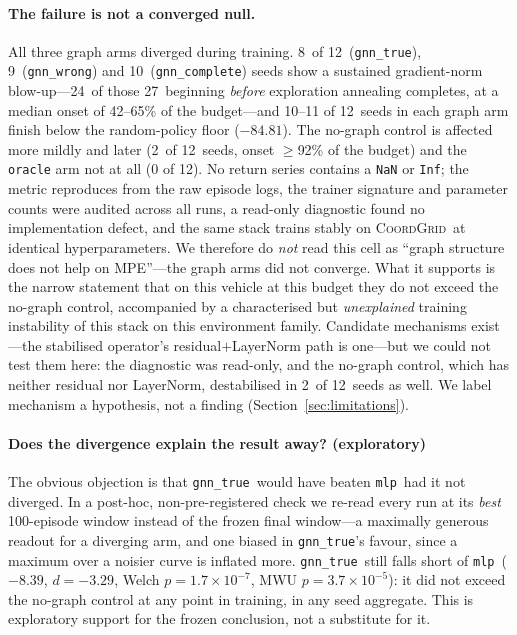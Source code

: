 \documentclass[10pt]{article}
\newcommand{\coordgrid}{\textsc{CoordGrid}}
\newcommand{\gtrue}{\texttt{gnn\_true}}
\newcommand{\gwrong}{\texttt{gnn\_wrong}}
\newcommand{\gcomplete}{\texttt{gnn\_complete}}
\newcommand{\mlpc}{\texttt{mlp}}
\newcommand{\PDseeds}{12}
\newcommand{\PDfloor}{-84.81}          %
\newcommand{\PDpeakGap}{-8.39}         %
\newcommand{\PDpeakD}{{-}3.29}
\newcommand{\PDblowTrue}{8}            %
\newcommand{\PDblowWrong}{9}
\newcommand{\PDblowComplete}{10}
\newcommand{\PDblowMlp}{2}
\newcommand{\PDblowEarly}{24}          %
\newcommand{\PDblowTotal}{27}
\newcommand{\PDonsetLo}{42}            %
\newcommand{\PDonsetHi}{65}            %
\begin{document}
\paragraph{The failure is not a converged null.} All three graph arms diverged
during training. \PDblowTrue\ of \PDseeds\ (\gtrue), \PDblowWrong\ (\gwrong)
and \PDblowComplete\ (\gcomplete) seeds show a sustained gradient-norm
blow-up---\PDblowEarly\ of those \PDblowTotal\ beginning \emph{before}
exploration annealing completes, at a median onset of
\PDonsetLo--\PDonsetHi\% of the budget---and 10--11 of \PDseeds\ seeds in each
graph arm finish below the random-policy floor ($\PDfloor$). The no-graph
control is affected more mildly and later (\PDblowMlp\ of \PDseeds\ seeds,
onset $\geq{}$92\% of the budget) and the \texttt{oracle} arm not at all (0 of
\PDseeds). No return series contains a \texttt{NaN} or \texttt{Inf}; the metric
reproduces from the raw episode logs, the trainer signature and parameter
counts were audited across all runs, a read-only diagnostic found no
implementation defect, and the same stack trains stably on \coordgrid\ at
identical hyperparameters. We therefore do \emph{not} read this cell as ``graph
structure does not help on MPE''---the graph arms did not converge. What it
supports is the narrow statement that on this vehicle at this budget they do
not exceed the no-graph control, accompanied by a characterised but
\emph{unexplained} training instability of this stack on this environment
family. Candidate mechanisms exist---the stabilised operator's
residual$+$LayerNorm path is one---but we could not test them here: the
diagnostic was read-only, and the no-graph control, which has neither residual
nor LayerNorm, destabilised in \PDblowMlp\ of \PDseeds\ seeds as well. We label
mechanism a hypothesis, not a finding (Section~\ref{sec:limitations}).

\paragraph{Does the divergence explain the result away? (exploratory)} The
obvious objection is that \gtrue\ would have beaten \mlpc\ had it not diverged.
In a post-hoc, non-pre-registered check we re-read every run at its \emph{best}
100-episode window instead of the frozen final window---a maximally generous
readout for a diverging arm, and one biased in \gtrue's favour, since a maximum
over a noisier curve is inflated more. \gtrue\ still falls short of \mlpc\
($\PDpeakGap$, $d{=}\PDpeakD$, Welch $p{=}1.7{\times}10^{-7}$, MWU
$p{=}3.7{\times}10^{-5}$): it did not exceed the no-graph control at any point
in training, in any seed aggregate. This is exploratory support for the frozen
conclusion, not a substitute for it.
\end{document}
